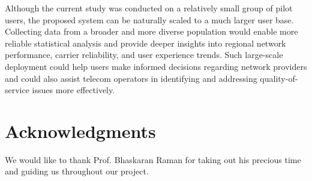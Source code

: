\documentclass{article}
\theoremstyle{plain}
\theoremstyle{definition}
\theoremstyle{remark}
\begin{document}
Although the current study was conducted on a relatively small group of pilot users, the proposed system can be naturally scaled to a much larger user base. Collecting data from a broader and more diverse population would enable more reliable statistical analysis and provide deeper insights into regional network performance, carrier reliability, and user experience trends. Such large-scale deployment could help users make informed decisions regarding network providers and could also assist telecom operators in identifying and addressing quality-of-service issues more effectively.


\section{Acknowledgments}
We would like to thank Prof. Bhaskaran Raman for taking out his precious time and guiding us throughout our project.


\nocite{langley00}






\end{document}
